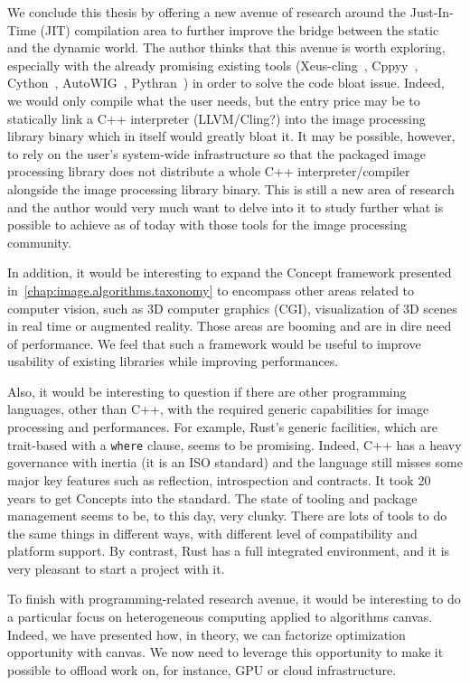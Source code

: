 We conclude this thesis by offering a new avenue of research around the Just-In-Time (JIT) compilation area to further
improve the bridge between the static and the dynamic world. The author thinks that this avenue is worth exploring,
especially with the already promising existing tools (Xeus-cling~\parencite{quantstack.2021.xeus-cling},
Cppyy~\parencite{wimtlplavrijsen.2016.cppyy}, Cython~\parencite{behnel.2010.cython},
AutoWIG~\parencite{fernique.2018.autowig}, Pythran~\parencite{guelton.2015.pythran}) in order to solve the code bloat
issue. Indeed, we would only compile what the user needs, but the entry price may be to statically link a C++
interpreter (LLVM/Cling?) into the image processing library binary which in itself would greatly bloat it. It may be
possible, however, to rely on the user's system-wide infrastructure so that the packaged image processing library does
not distribute a whole C++ interpreter/compiler alongside the image processing library binary. This is still a new area
of research and the author would very much want to delve into it to study further what is possible to achieve as of
today with those tools for the image processing community.

In addition, it would be interesting to expand the Concept framework presented in~\cref{chap:image.algorithms.taxonomy}
to encompass other areas related to computer vision, such as 3D computer graphics (CGI), visualization of 3D scenes in
real time or augmented reality. Those areas are booming and are in dire need of performance. We feel that such a
framework would be useful to improve usability of existing libraries while improving performances.

Also, it would be interesting to question if there are other programming languages, other than C++, with the required
generic capabilities for image processing and performances. For example, Rust's generic facilities, which are
trait-based  with a \texttt{where} clause, seems to be promising. Indeed, C++ has a heavy governance with inertia (it is
an ISO standard) and the language still misses some major key features such as reflection, introspection and contracts.
It took 20 years to get Concepts into the standard. The state of tooling and package management seems to be, to this
day, very clunky. There are lots of tools to do the same things in different ways, with different level of compatibility
and platform support. By contrast, Rust has a full integrated environment, and it is very pleasant to start a project
with it.

To finish with programming-related research avenue, it would be interesting to do a particular focus on heterogeneous
computing applied to algorithms canvas. Indeed, we have presented how, in theory, we can factorize optimization
opportunity with canvas. We now need to leverage this opportunity to make it possible to offload work on, for instance,
GPU or cloud infrastructure.

